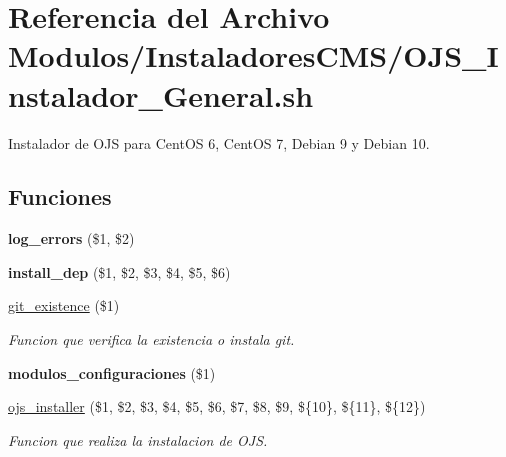 \hypertarget{OJS__Instalador__General_8sh}{}\section{Referencia del Archivo Modulos/\+Instaladores\+C\+M\+S/\+O\+J\+S\+\_\+\+Instalador\+\_\+\+General.sh}
\label{OJS__Instalador__General_8sh}


Instalador de O\+JS para Cent\+OS 6, Cent\+OS 7, Debian 9 y Debian 10.  


\subsection*{Funciones}
\begin{DoxyCompactItemize}
\item 
\mbox{\label{OJS__Instalador__General_8sh_a92067b58a8478c9841b2cd9b75ea3565}} 
{\bfseries log\+\_\+errors} (\$1, \$2)
\item 
\mbox{\label{OJS__Instalador__General_8sh_a0def5b6b697b8869c4772673d56a5a4a}} 
{\bfseries install\+\_\+dep} (\$1, \$2, \$3, \$4, \$5, \$6)
\item 
\hyperlink{OJS__Instalador__General_8sh_acb263c3e6443d96a7048d5e672616b9d}{git\+\_\+existence} (\$1)
\begin{DoxyCompactList}\small\item\em Funcion que verifica la existencia o instala git. \end{DoxyCompactList}\item 
\mbox{\label{OJS__Instalador__General_8sh_ae5ce76ad68690ff00cb63811e18c8a37}} 
{\bfseries modulos\+\_\+configuraciones} (\$1)
\item 
\hyperlink{OJS__Instalador__General_8sh_a9608ed294e757cd331743fa2d2f68d13}{ojs\+\_\+installer} (\$1, \$2, \$3, \$4, \$5, \$6, \$7, \$8, \$9, \$\{10\}, \$\{11\}, \$\{12\})
\begin{DoxyCompactList}\small\item\em Funcion que realiza la instalacion de O\+JS. \end{DoxyCompactList}\end{DoxyCompactItemize}


